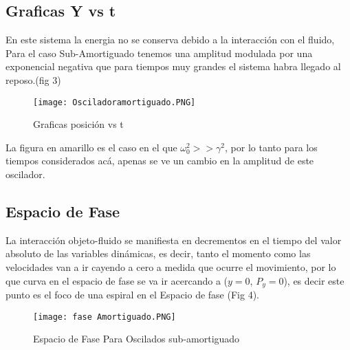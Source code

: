 \documentclass{article}
\begin{document}
\subsection{Graficas Y vs t}
En este sistema la energia no se conserva debido a la interacción con el fluido, Para el caso Sub-Amortiguado tenemos una amplitud modulada por una exponencial negativa que para tiempos muy grandes el sistema habra llegado al reposo.(fig 3)
\begin{figure}[H]
    \centering
    \texttt{[image: Osciladoramortiguado.PNG]}
    \caption{Graficas posición vs t}
    \label{fig:my_label}
\end{figure}
La figura en amarillo es el caso en el que $\omega^2_0 >> \gamma^2$, por lo tanto para los tiempos considerados acá, apenas se ve un cambio en la amplitud de  este oscilador.

\subsection{Espacio de Fase}
La interacción objeto-fluido se manifiesta en decrementos en el tiempo del valor absoluto de las variables dinámicas, es decir, tanto el momento como las velocidades van a ir cayendo a cero a medida que ocurre el movimiento, por lo que curva en el espacio de fase se va ir acercando a ($y=0$, $P_y=0$), es decir este punto es el foco de una espiral en el Espacio de fase (Fig 4).

\begin{figure}[H]
    \centering
    \texttt{[image: fase Amortiguado.PNG]}
    \caption{Espacio de Fase Para Oscilados sub-amortiguado}
    \label{fig:my_label}
\end{figure}
\end{document}
